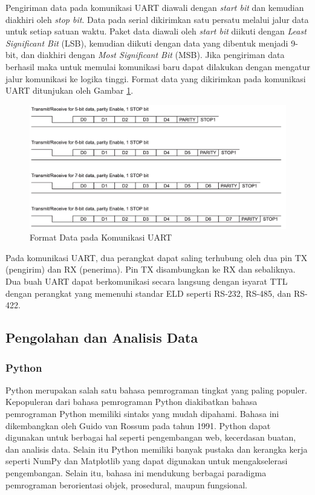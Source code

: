  Pengiriman data pada komunikasi UART diawali dengan \textit{start bit} dan kemudian diakhiri oleh \textit{stop bit}. Data pada serial dikirimkan satu persatu melalui jalur data untuk setiap satuan waktu. Paket data diawali oleh \textit{start bit} diikuti dengan \textit{Least Significant Bit} (LSB), kemudian diikuti dengan data yang dibentuk menjadi 9-bit, dan diakhiri dengan \textit{Most Significant Bit} (MSB). Jika pengiriman data berhasil maka untuk memulai komunikasi baru dapat dilakukan dengan mengatur jalur komunikasi ke logika tinggi. Format data yang dikirimkan pada komunikasi UART ditunjukan oleh Gambar \ref{Fig: uart-format}.

\begin{figure}[H]
	\centering
	\includegraphics[width=12cm]{contents/chapter-2/uart-format.png}
	\caption{Format Data pada Komunikasi UART \cite{ti2010}}
	\label{Fig: uart-format}
\end{figure}

Pada komunikasi UART, dua perangkat dapat saling terhubung oleh dua pin TX (pengirim) dan RX (penerima). Pin TX disambungkan ke RX dan sebaliknya. Dua buah UART dapat berkomunikasi secara langsung dengan isyarat TTL dengan perangkat yang memenuhi standar ELD seperti RS-232, RS-485, dan RS-422.

\subsection{Pengolahan dan Analisis Data}

\subsubsection{Python}
Python merupakan salah satu bahasa pemrograman tingkat yang paling populer. Kepopuleran dari bahasa pemrograman Python diakibatkan bahasa pemrograman Python memiliki sintaks yang mudah dipahami. Bahasa ini dikembangkan oleh Guido van Rossum pada tahun 1991. Python dapat digunakan untuk berbagai hal seperti pengembangan web, kecerdasan buatan, dan analisis data. Selain itu Python memiliki banyak pustaka dan kerangka kerja seperti NumPy dan Matplotlib yang dapat digunakan untuk mengakselerasi pengembangan. Selain itu, bahasa ini mendukung berbagai paradigma pemrograman berorientasi objek, prosedural, maupun fungsional.

